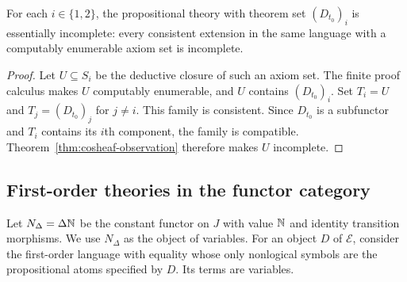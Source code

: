 \begin{corollary}\label{cor:cosheaf-essential-incompleteness}
For each $i\in\{1,2\}$, the propositional theory with theorem set
$(D_{t_0})_i$ is essentially incomplete: every consistent extension in
the same language with a computably enumerable axiom set is incomplete.
\end{corollary}
\begin{proof}
Let $U\subseteq S_i$ be the deductive closure of such an axiom set.
The finite proof calculus makes $U$ computably enumerable, and
$U$ contains $(D_{t_0})_i$.
Set $T_i=U$ and $T_j=(D_{t_0})_j$ for $j\ne i$.
This family is consistent. Since $D_{t_0}$ is a subfunctor and
$T_i$ contains its $i$th component, the family is compatible.
Theorem~\ref{thm:cosheaf-observation} therefore makes $U$ incomplete.
\end{proof}

\subsection{First-order theories in the functor category}
\label{subsec:fork-first-order}

Let $N_\Delta=\Delta\mathbb N$ be the constant functor on $J$ with value
$\mathbb N$ and identity transition morphisms. We use $N_\Delta$ as the
object of variables. For an object $D$ of $\mathcal E$, consider
the first-order language with equality whose only nonlogical symbols
are the propositional atoms specified by $D$. Its terms are variables.

